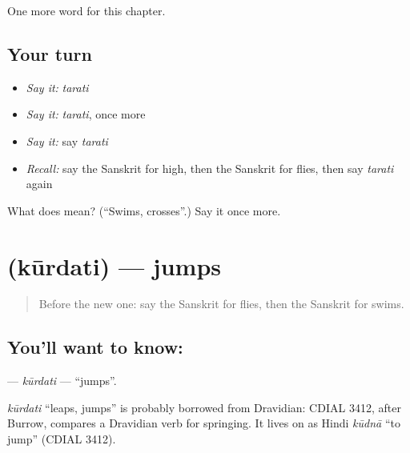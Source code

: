 \begin{grammarlens}[title={What you've built}]
One more word for this chapter.
\end{grammarlens}

\subsection*{Your turn}
\begin{itemize}
\raggedright
  \item \emph{Say it:} \emph{tarati}
  \item \emph{Say it:} \emph{tarati}, once more
  \item \emph{Say it:} say \emph{tarati}
  \item \emph{Recall:} say the Sanskrit for high, then the Sanskrit for flies, then say \emph{tarati} again
\end{itemize}

\begin{tcolorbox}[breakable,colback=teal!4,colframe=teal!35!black,title={Before you move on}]
What does  mean? (\textquotedblleft{}Swims, crosses\textquotedblright{}.) Say it once more.
\end{tcolorbox}
\section[\texorpdfstring{\sk{कूर्दति} (kūrdati)}{कूर्दति (kūrdati)}]{ (kūrdati) — jumps}

\label{lesson:SA-C133-kurdati}



\begin{quote}
Before the new one: say the Sanskrit for flies, then the Sanskrit for swims.
\end{quote}

\subsection*{You'll want to know: }
\textbf{} — \emph{kūrdati} — \textquotedblleft{}jumps\textquotedblright{}.

\begin{cousinweb}
\emph{kūrdati} \textquotedblleft{}leaps, jumps\textquotedblright{} is probably borrowed from Dravidian: CDIAL 3412, after Burrow, compares a Dravidian verb for springing. It lives on as Hindi \emph{kūdnā} \textquotedblleft{}to jump\textquotedblright{} (CDIAL 3412).
\end{cousinweb}

